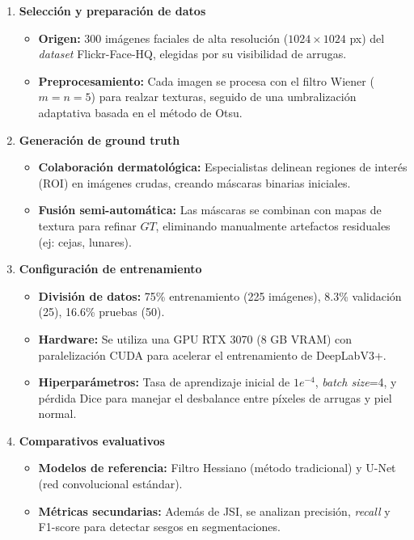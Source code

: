 \begin{enumerate}[label=\textbf{\arabic*.}, leftmargin=2em]
    \item \textbf{Selección y preparación de datos}
	\begin{itemize}
		\item \textbf{Origen:} 300 imágenes faciales de alta resolución ($1024 \times 1024$ px) del \textit{dataset} Flickr-Face-HQ, elegidas por su visibilidad de arrugas.
		\item \textbf{Preprocesamiento:} Cada imagen se procesa con el filtro Wiener ($m=n=5$) para realzar texturas, seguido de una umbralización adaptativa basada en el método de Otsu.
	\end{itemize}

	\item \textbf{Generación de ground truth}
	\begin{itemize}
		\item \textbf{Colaboración dermatológica:} Especialistas delinean regiones de interés (ROI) en imágenes crudas, creando máscaras binarias iniciales.
		\item \textbf{Fusión semi-automática:} Las máscaras se combinan con mapas de textura para refinar $GT$, eliminando manualmente artefactos residuales (ej: cejas, lunares).
	\end{itemize}
	
	\item \textbf{Configuración de entrenamiento}
	\begin{itemize}
		\item \textbf{División de datos:} 75\% entrenamiento (225 imágenes), 8.3\% validación (25), 16.6\% pruebas (50).
		\item \textbf{Hardware:} Se utiliza una GPU RTX 3070 (8 GB VRAM) con paralelización CUDA para acelerar el entrenamiento de DeepLabV3+.
		\item \textbf{Hiperparámetros:} Tasa de aprendizaje inicial de $1e^{-4}$, \textit{batch size}=4, y pérdida Dice para manejar el desbalance entre píxeles de arrugas y piel normal.
	\end{itemize}

	\item \textbf{Comparativos evaluativos}
	\begin{itemize}
		\item \textbf{Modelos de referencia:} Filtro Hessiano (método tradicional) y U-Net (red convolucional estándar).
		\item \textbf{Métricas secundarias:} Además de JSI, se analizan precisión, \textit{recall} y F1-score para detectar sesgos en segmentaciones.
	\end{itemize}
	

\end{enumerate}
